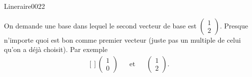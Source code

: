 \begin{corrige}{Lineraire0022}

	On demande une base dans lequel le second vecteur de base est $\begin{pmatrix}
		1	\\ 
		2	
	\end{pmatrix}$. Presque n'importe quoi est bon comme premier vecteur (juste pas un multiple de celui qu'on a déjà choisit). Par exemple
	\begin{equation}
		\begin{aligned}[]
			\begin{pmatrix}
				1	\\ 
				0	
			\end{pmatrix}&&\text{et}&&\begin{pmatrix}
				1	\\ 
				2	
			\end{pmatrix}.
		\end{aligned}
	\end{equation}
	

\end{corrige}
